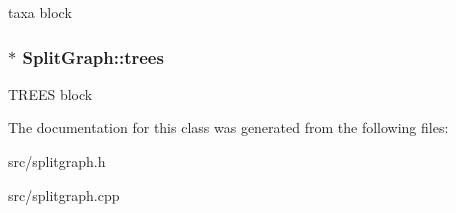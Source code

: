 \label{classSplitGraph_a3166d128ac9e267baf86d309deadb988}
taxa block \hypertarget{classSplitGraph_ad3f25cc271cafddeb348ba92cbcb9f59}{
\subsubsection[{trees}]{$\ast$ {\bf SplitGraph::trees}}}
\label{classSplitGraph_ad3f25cc271cafddeb348ba92cbcb9f59}
TREES block 

The documentation for this class was generated from the following files:\begin{DoxyCompactItemize}
\item 
src/splitgraph.h\item 
src/splitgraph.cpp\end{DoxyCompactItemize}
